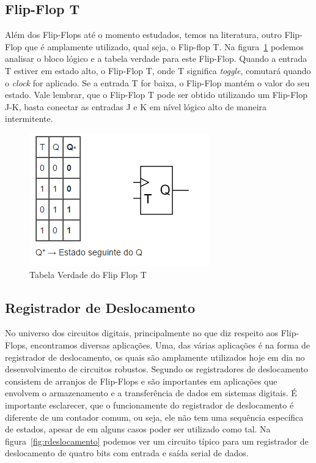 \documentclass[12pt]{article}
\begin{document}
\subsection{Flip-Flop T}

Além dos Flip-Flops até o momento estudados, temos na literatura, outro Flip-Flop que é amplamente utilizado, qual seja, o Flip-flop T. Na figura~\ref{fig:fft} podemos analisar o bloco lógico e a tabela verdade para este Flip-Flop. Quando a entrada T estiver em estado alto, o Flip-Flop T, onde T significa \textit{toggle}, comutará quando o \textit{clock} for aplicado. Se a entrada T for baixa, o Flip-Flop mantém o valor do seu estado. Vale lembrar, que o Flip-Flop T pode ser obtido utilizando um Flip-Flop J-K, basta conectar as entradas J e K em nível lógico alto de maneira intermitente.  


\begin{figure}[h]
\centering
\includegraphics[width=.5\textwidth]{img/fig4Flip-Flopt.png}
\caption{Tabela Verdade do Flip Flop T}
\label{fig:fft}
\end{figure}

\subsection{Registrador de Deslocamento}

No universo dos circuitos digitais, principalmente no que diz respeito aos Flip-Flops, encontramos diversas aplicações. Uma, das várias aplicações é na forma de registrador de deslocamento, os quais são amplamente utilizados hoje em dia no desenvolvimento de circuitos robustos. Segundo \cite{floyd2011digital} os registradores de deslocamento consistem de arranjos de Flip-Flops e são importantes em aplicações que envolvem o armazenamento e a transferência de dados em sistemas digitais. É importante esclarecer, que o funcionamente do registrador de deslocamento é diferente de um contador comum, ou seja, ele não tem uma sequência específica de estados, apesar de em alguns casos poder ser utilizado como tal. Na figura~\ref{fig:rdeslocamento} podemos ver um circuito típico para um registrador de deslocamento de quatro bits com entrada e saída serial de dados.
\end{document}
